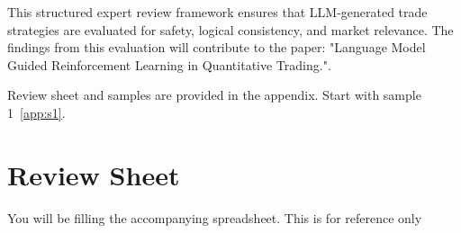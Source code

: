 \documentclass[8pt]{scrartcl}
\begin{document}
This structured expert review framework ensures that LLM-generated trade strategies are evaluated for safety, logical consistency, and market relevance. The findings from this evaluation will contribute to the paper: "Language Model Guided Reinforcement Learning in Quantitative Trading.".

Review sheet and samples are provided in the appendix. Start with sample 1~\ref{app:s1}.




\newpage

\appendix
\section*{Review Sheet}
\label{app:Review_Sheet}

You will be filling the accompanying spreadsheet. This is for reference only

\begin{table}[h]
    \centering
    \renewcommand{\arraystretch}{1.3}
    \setlength{\tabcolsep}{5pt}
    \caption{Expert Review Sheet with Reviewer Information}
\end{table}
\end{document}

